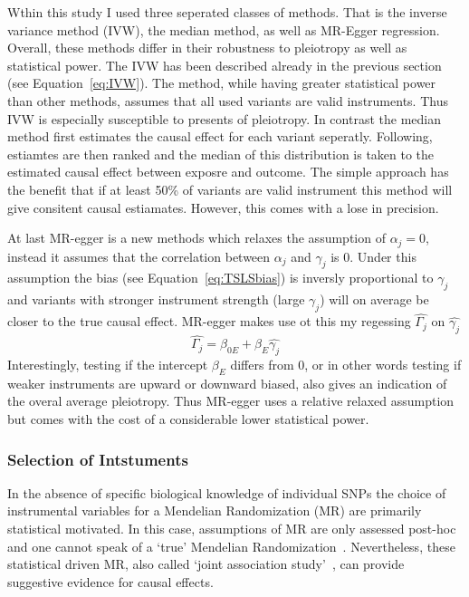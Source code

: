 Wthin this study I used three seperated classes of methods.
That is the inverse variance method (IVW), the median method, as well as MR-Egger regression.
Overall, these methods differ in their robustness to pleiotropy as well as statistical power.
The IVW has been described already in the previous section (see Equation~\ref{eq:IVW}).
The method, while having greater statistical power than other methods, assumes that all used variants are valid instruments.
Thus IVW is especially susceptible to presents of pleiotropy.
In contrast the median method first estimates the causal effect for each variant seperatly. 
Following, estiamtes are then ranked and the median of this distribution is taken to the estimated causal effect between exposre and outcome.
The simple approach has the benefit that if at least 50\% of variants are valid instrument this method will give consitent causal estiamates.
However, this comes with a lose in precision.

At last MR-egger is a new methods which relaxes the assumption of $\alpha_j=0$, instead it assumes that the correlation between $\alpha_j$ and $\gamma_j$ is $0$.
Under this assumption the bias (see Equation~\ref{eq:TSLSbias}) is inversly proportional to $\gamma_j$ and variants with stronger instrument strength (large $\gamma_j$) will on average be closer to the true causal effect.
MR-egger makes use ot this my regessing $\hat{\Gamma_j}$ on $\hat{\gamma_j}$
\begin{equation}\label{eq:egger}
  \hat{\Gamma_j} = \beta_{0E} + \beta_{E} \hat{\gamma_j}
\end{equation}
Interestingly, testing if the intercept $\beta_E$ differs from $0$, or in other words testing if weaker instruments are upward or downward biased, also gives an indication of the overal average pleiotropy.
Thus MR-egger uses a relative relaxed assumption but comes with the cost of a considerable lower statistical power.

\subsubsection{Selection of Intstuments}
\label{ssub:Selection_of_Intstuments}

In the absence of specific biological knowledge of individual SNPs the choice of instrumental variables for a Mendelian Randomization (MR) are primarily statistical motivated.
In this case, assumptions of MR are only assessed post-hoc and one cannot speak of a `true' Mendelian Randomization~\cite{Burgess2016a}.
Nevertheless, these statistical driven MR, also called `joint association study'~\cite{Burgess2016a}, can provide suggestive evidence for causal effects.

